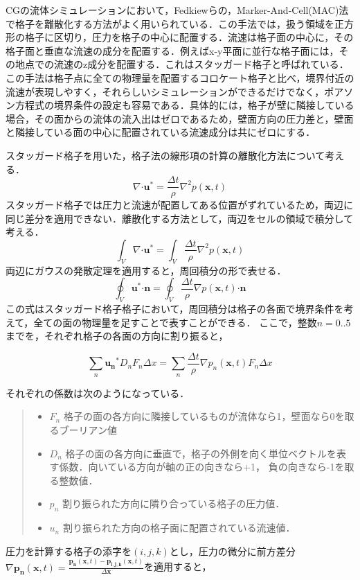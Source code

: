 \documentclass[a4j,12pt]{jreport}
\begin{document}
CGの流体シミュレーションにおいて，Fedkiewらの，Marker-And-Cell(MAC)法で格子を離散化する方法がよく用いられている．この手法では，扱う領域を正方形の格子に区切り，圧力を格子の中心に配置する．流速は格子面の中心に，その格子面と垂直な流速の成分を配置する．例えばx-y平面に並行な格子面には，その地点での流速のz成分を配置する．これはスタッガード格子と呼ばれている．この手法は格子点に全ての物理量を配置するコロケート格子と比べ，境界付近の流速が表現しやすく，それらしいシミュレーションができるだけでなく，ポアソン方程式の境界条件の設定も容易である．具体的には，格子が壁に隣接している場合，その面からの流体の流入出はゼロであるため，壁面方向の圧力差と，壁面と隣接している面の中心に配置されている流速成分は共にゼロにする．

スタッガード格子を用いた，格子法の線形項の計算の離散化方法について考える．
$$\nabla\boldsymbol{\cdot}\bm{u}^* = \frac{\Delta t}{\rho}\nabla^2 p(\bm{x},t)$$
スタッガード格子では圧力と流速が配置してある位置がずれているため，両辺に同じ差分を適用できない．離散化する方法として，両辺をセルの領域で積分して考える．
$$\int_V\nabla\boldsymbol{\cdot}\bm{u}^* = \int_V\frac{\Delta t}{\rho}\nabla^2 p(\bm{x},t)$$
両辺にガウスの発散定理を適用すると，周回積分の形で表せる．
$$\oint_V\bm{u}^*\boldsymbol{\cdot}\bm{n} = \oint_V\frac{\Delta t}{\rho}\nabla p(\bm{x},t)\boldsymbol{\cdot}\bm{n}$$
この式はスタッガード格子格子において，周回積分は格子の各面で境界条件を考えて，全ての面の物理量を足すことで表すことができる．
ここで，整数$n=0..5$までを，それぞれ格子の各面の方向に割り振ると，

$$ \sum_{n}\bm{u_n}^*D_nF_n\Delta x = \sum_{n}\frac{\Delta t}{\rho}\nabla p_n(\bm{x},t)F_n\Delta x $$

それぞれの係数は次のようになっている．
\begin{quote}
	\begin{itemize}
		\item $F_n$ 格子の面の各方向に隣接しているものが流体なら1，壁面なら0を取るブーリアン値
		\item $D_n$ 格子の面の各方向に垂直で，格子の外側を向く単位ベクトルを表す係数．向いている方向が軸の正の向きなら+1，					負の向きなら-1を取る整数値．
		\item $p_n$ 割り振られた方向に隣り合っている格子の圧力値．
		\item $u_n$ 割り振られた方向の格子面に配置されている流速値．
	\end{itemize}
\end{quote}

圧力を計算する格子の添字を$(i,j,k)$とし，圧力の微分に前方差分$\nabla \bm{p_n}(\bm{x},t) = \frac{\bm{p_n}(\bm{x},t) - \bm{p_{i,j,k}}(\bm{x},t)}{\Delta \bm{x}}$を適用すると，
\end{document}
